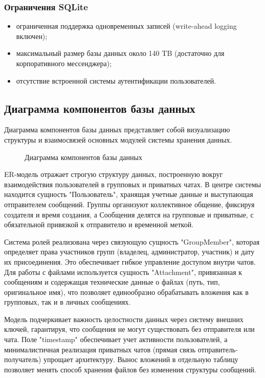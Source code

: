 \subsubsection{Ограничения SQLite}
\begin{itemize}
	\item ограниченная поддержка одновременных записей (write-ahead logging включен);
	\item максимальный размер базы данных около 140 TB (достаточно для корпоративного мессенджера);
	\item отсутствие встроенной системы аутентификации пользователей.
\end{itemize}

\subsection{Диаграмма компонентов базы данных}

Диаграмма компонентов базы данных представляет собой визуализацию структуры и взаимосвязей основных модулей системы хранения данных.

\begin{figure}[ht]
\caption{Диаграмма компонентов базы данных}
\label{comp:image}
\end{figure}

ER-модель отражает строгую структуру данных, построенную вокруг взаимодействия пользователей в групповых и приватных чатах. В центре системы находится сущность "Пользователь", хранящая учетные данные и выступающая отправителем сообщений. Группы организуют коллективное общение, фиксируя создателя и время создания, а Сообщения делятся на групповые и приватные, с обязательной привязкой к отправителю и временной меткой.

Система ролей реализована через связующую сущность "GroupMember", которая определяет права участников групп (владелец, администратор, участник) и дату их присоединения. Это обеспечивает гибкое управление доступом внутри чатов. Для работы с файлами используется сущность "Attachment", привязанная к сообщениям и содержащая технические данные о файлах (путь, тип, оригинальное имя), что позволяет единообразно обрабатывать вложения как в групповых, так и в личных сообщениях.

Модель подчеркивает важность целостности данных через систему внешних ключей, гарантируя, что сообщения не могут существовать без отправителя или чата. Поле "timestamp" обеспечивает учет активности пользователей, а минималистичная реализация приватных чатов (прямая связь отправитель-получатель) упрощает архитектуру. Вынос вложений в отдельную таблицу позволяет менять способ хранения файлов без изменения структуры сообщений.

